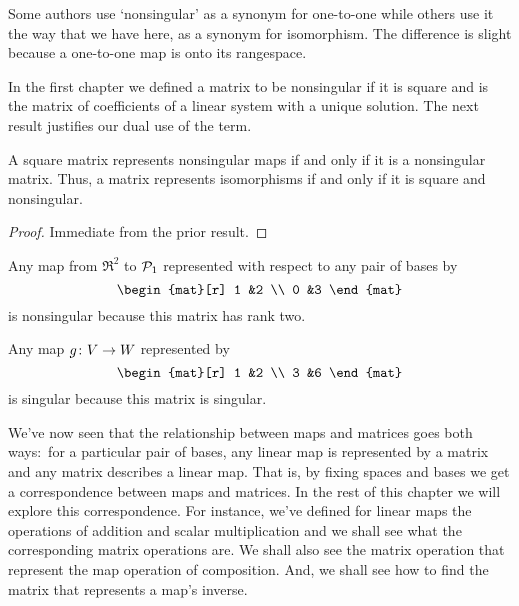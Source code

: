 \begin{remark}
Some authors use `nonsingular' as a synonym for one-to-one  
while others use it the way that we have here, as a synonym for
isomorphism.
The difference is slight because a one-to-one map is onto its
rangespace.
\end{remark}

In the first chapter we defined a matrix to be nonsingular 
if it is square and is
the matrix of coefficients of a linear system with a unique solution.
The next result justifies our dual use of the term.

\begin{corollary} \label{cor:NonsingMatIffNonsingMap}
A square matrix represents nonsingular maps if and only if it is a nonsingular
matrix.
Thus, a matrix represents isomorphisms if and only if it is square and
nonsingular. 
\end{corollary}

\begin{proof}
Immediate from the prior result.
\end{proof}

\begin{example}
Any map from \( \Re^2 \) to \( \mathcal{P}_1 \) represented 
with respect to any pair of bases by
\begin{equation*}
  \begin{mat}[r]
     1  &2  \\
     0  &3  
  \end{mat}
\end{equation*}
is nonsingular because this matrix has rank two.
\end{example}

\begin{example} \label{ex:NonSMatHasNonSMap}
Any map \( \mbox{$g\colon V\to W$} \) represented by
\begin{equation*}
  \begin{mat}[r]
    1  &2  \\
    3  &6
  \end{mat}
\end{equation*}
is singular because this matrix is singular.
\end{example}

We've now seen that the relationship between maps and 
matrices goes both ways:~for a particular pair of bases, 
any linear map is represented by a
matrix and any matrix describes a linear map.
That is, by fixing spaces and bases we get
a correspondence between maps and matrices.
In the rest of this chapter we will explore this correspondence.
For instance, we've defined for linear maps the operations of addition 
and scalar multiplication and we shall see what the corresponding matrix 
operations are.
We shall also see the matrix operation that represent the map operation
of composition.
And, we shall see how to find the matrix that represents a map's inverse.


